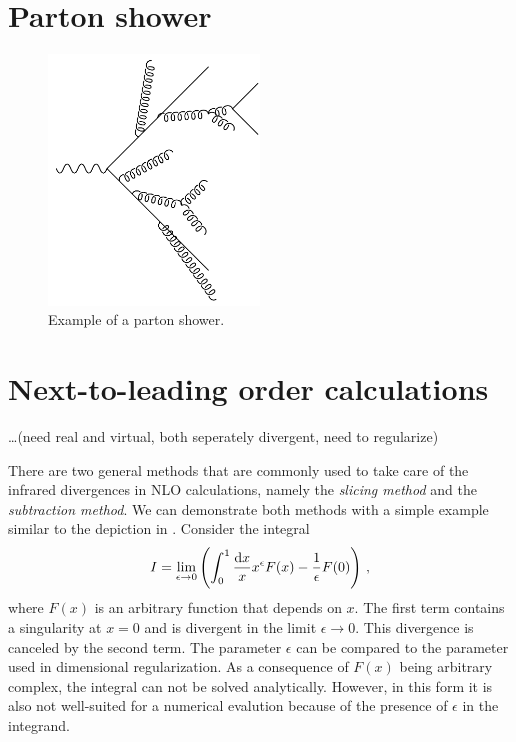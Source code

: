 \section{Parton shower}
%
\begin{figure}[]
	\includegraphics[width=0.5\textwidth]{images/partonshower.pdf}
	\caption{Example of a parton shower.}
	\label{fig:partonshower}
\end{figure}
%
%
\section{Next-to-leading order calculations}
\label{sec:nlo_calculations}
\ldots(need real and virtual, both seperately divergent, need to regularize)


There are two general methods that are commonly used to take care of the infrared divergences in NLO calculations, namely the \textit{slicing method} and the \textit{subtraction method}.
We can demonstrate both methods with a simple example similar to the depiction in \cite{slicing_vs_subtraction}.
Consider the integral
%
\begin{equation}
	I = \lim_{\epsilon \rightarrow 0} \left( \int_0^1 \frac{\dif x}{x} x^\epsilon F(x) - \frac{1}{\epsilon} F(0) \right) \, ,
\end{equation}
%
where $F(x)$ is an arbitrary function that depends on $x$.
The first term contains a singularity at $x=0$ and is divergent in the limit $\epsilon \rightarrow 0$.
This divergence is canceled by the second term.
The parameter $\epsilon$ can be compared to the parameter used in dimensional regularization.
As a consequence of $F(x)$ being arbitrary complex, the integral can not be solved analytically.
However, in this form it is also not well-suited for a numerical evalution because of the presence of $\epsilon$ in the integrand.

